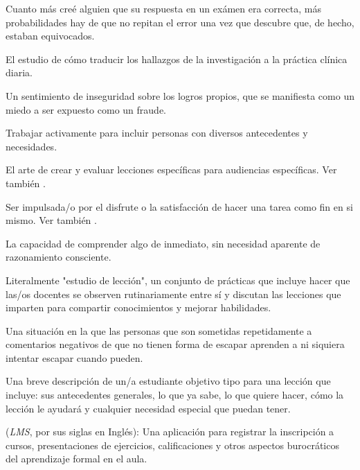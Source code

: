 \begin{description}
 Cuanto más creé alguien 
que su respuesta en un exámen era correcta, más probabilidades hay de que no 
repitan el error una vez que descubre que, de hecho, estaban equivocados.

 El estudio de cómo traducir 
los hallazgos de la investigación a la práctica clínica diaria.

 Un sentimiento de inseguridad sobre 
los logros propios, que se manifiesta como un miedo a ser expuesto como un fraude.

 Trabajar activamente para incluir 
personas con diversos antecedentes y necesidades.



 El arte de crear y evaluar 
lecciones específicas para audiencias específicas. Ver también
.



 Ser impulsada/o por el disfrute o 
la satisfacción de hacer una tarea como fin en si mismo.  Ver también
.

 La capacidad de comprender algo de inmediato, 
sin necesidad aparente de razonamiento consciente.

 Literalmente "estudio de lección", un conjunto de prácticas que incluye hacer que las/os docentes se observen rutinariamente entre sí y discutan las lecciones que imparten para compartir conocimientos y mejorar habilidades.

 Una situación en la que las personas que son sometidas repetidamente a comentarios negativos de que no tienen forma de escapar aprenden a ni siquiera intentar escapar cuando pueden.

 Una breve descripción de un/a estudiante objetivo tipo
para una lección que incluye: sus antecedentes generales, lo que ya sabe, lo que quiere hacer, cómo la lección le ayudará y cualquier necesidad especial que puedan tener.

 (\emph{LMS}, por sus siglas en Inglés): Una aplicación para registrar la inscripción a cursos, presentaciones de ejercicios, calificaciones y otros aspectos burocráticos del aprendizaje formal en el aula.


\end{description}
